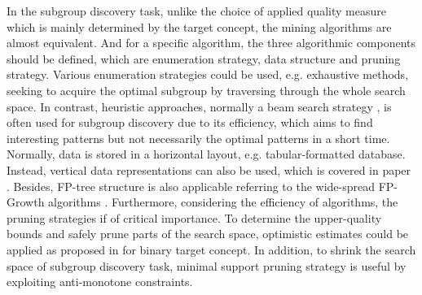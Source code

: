 In the subgroup discovery task, unlike the choice of applied quality measure which is mainly determined by the target concept, the mining algorithms are almost equivalent. And for a specific algorithm, the three algorithmic components should be defined, which are enumeration strategy, data structure and pruning strategy. Various enumeration strategies could be used, e.g. exhaustive methods, seeking to acquire the optimal subgroup by traversing through the whole search space. In contrast, heuristic approaches, normally a beam search strategy \cite{clark1989cn2}, is often used for subgroup discovery due to its efficiency, which aims to find interesting patterns but not necessarily the optimal patterns in a short time. Normally, data is stored in a horizontal layout, e.g. tabular-formatted database. Instead, vertical data representations can also be used, which is covered in paper \cite{zaki2000scalable}. Besides, FP-tree structure is also applicable referring to the wide-spread FP-Growth algorithms \cite{han2000mining}. Furthermore, considering the efficiency of algorithms, the pruning strategies if of critical importance. To determine the upper-quality bounds and safely prune parts of the search space, optimistic estimates could be applied as proposed in \cite{wrobel1997algorithm} for binary target concept. In addition, to shrink the search space of subgroup discovery task, minimal support pruning strategy is useful by exploiting anti-monotone constraints.  



